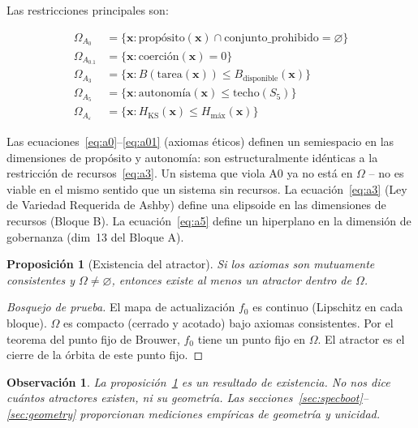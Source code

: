 \documentclass[11pt, a4paper]{article}
\newtheorem{proposition}[theorem]{Proposición}
\newtheorem{remark}{Observación}
\newcommand{\sv}{\bm{x}}
\begin{document}
Las restricciones principales son:

\begin{align}
  \Omega_{A_0}       &= \bigl\{ \sv : \mathrm{propósito}(\sv) \cap
                        \mathrm{conjunto\_prohibido} = \varnothing \bigr\}
  \label{eq:a0} \\
  \Omega_{A_{0.1}}   &= \bigl\{ \sv : \mathrm{coerción}(\sv) = 0 \bigr\}
  \label{eq:a01} \\
  \Omega_{A_3}       &= \bigl\{ \sv : B(\mathrm{tarea}(\sv)) \le B_\text{disponible}(\sv) \bigr\}
  \label{eq:a3} \\
  \Omega_{A_5}       &= \bigl\{ \sv : \mathrm{autonomía}(\sv) \le \mathrm{techo}(S_5) \bigr\}
  \label{eq:a5} \\
  \Omega_{A_\varepsilon} &= \bigl\{ \sv : H_\text{KS}(\sv) \le H_\text{máx}(\sv) \bigr\}
  \label{eq:ae}
\end{align}

Las ecuaciones~\eqref{eq:a0}--\eqref{eq:a01} (axiomas éticos) definen
un semiespacio en las dimensiones de propósito y autonomía:
son estructuralmente idénticas a la restricción de recursos~\eqref{eq:a3}.
Un sistema que viola A0 ya no está en $\Omega$ -- no es viable
en el mismo sentido que un sistema sin recursos.
La ecuación~\eqref{eq:a3} (Ley de Variedad Requerida de Ashby) define una
elipsoide en las dimensiones de recursos (Bloque B).
La ecuación~\eqref{eq:a5} define un hiperplano en la dimensión de gobernanza
(dim~13 del Bloque A).

\begin{proposition}[Existencia del atractor]
\label{prop:existence}
Si los axiomas son mutuamente consistentes y $\Omega \neq \varnothing$,
entonces existe al menos un atractor dentro de $\Omega$.
\end{proposition}

\begin{proof}[Bosquejo de prueba]
El mapa de actualización $f_0$ es continuo (Lipschitz en cada bloque).
$\Omega$ es compacto (cerrado y acotado) bajo axiomas consistentes.
Por el teorema del punto fijo de Brouwer, $f_0$ tiene un punto fijo en $\Omega$.
El atractor es el cierre de la órbita de este punto fijo.
\end{proof}

\begin{remark}
La proposición~\ref{prop:existence} es un resultado de existencia.
No nos dice cuántos atractores existen, ni su geometría.
Las secciones~\ref{sec:specboot}--\ref{sec:geometry} proporcionan mediciones
empíricas de geometría y unicidad.
\end{remark}
\end{document}
